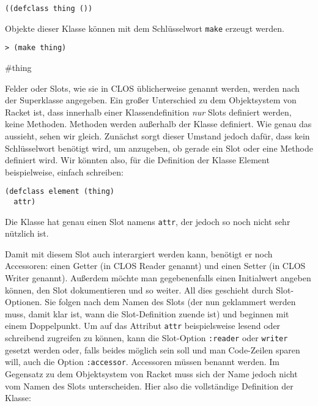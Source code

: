 \begin{lstlisting}
((defclass thing ())
\end{lstlisting}


Objekte dieser Klasse können mit dem Schlüsselwort \texttt{make} erzeugt werden.

\begin{lstlisting}
> (make thing)
\end{lstlisting}
{\routput \#thing}

Felder oder Slots, wie sie in CLOS üblicherweise genannt werden, werden nach der Superklasse angegeben. Ein großer Unterschied zu dem Objektsystem von Racket ist, dass innerhalb einer Klassendefinition \textit{nur} Slots definiert werden, keine Methoden. Methoden werden außerhalb der Klasse definiert. Wie genau das aussieht, sehen wir gleich. Zunächst sorgt dieser Umstand jedoch dafür, dass kein Schlüsselwort benötigt wird, um anzugeben, ob gerade ein Slot oder eine Methode definiert wird. Wir könnten also, für die Definition der Klasse Element beispielweise, einfach schreiben:

\begin{lstlisting}
(defclass element (thing)
  attr)
\end{lstlisting}

Die Klasse hat genau einen Slot namens \texttt{attr}, der jedoch so noch nicht sehr nützlich ist.

Damit mit diesem Slot auch interargiert werden kann, benötigt er noch Accessoren: einen Getter (in CLOS Reader genannt) und einen Setter (in CLOS Writer genannt). Außerdem möchte man gegebenenfalls einen Initialwert angeben können, den Slot dokumentieren und so weiter. All dies geschieht durch Slot-Optionen. Sie folgen nach dem Namen des Slots (der nun geklammert werden muss, damit klar ist, wann die Slot-Definition zuende ist) und beginnen mit einem Doppelpunkt. Um auf das Attribut \texttt{attr} beispielsweise lesend oder schreibend zugreifen zu können, kann die Slot-Option \texttt{:reader} oder \texttt{writer} gesetzt werden oder, falls beides möglich sein soll und man Code-Zeilen sparen will, auch die Option \texttt{:accessor}. Accessoren müssen benannt werden. Im Gegensatz zu dem Objektsystem von Racket muss sich der Name jedoch nicht vom Namen des Slots unterscheiden. Hier also die vollständige Definition der Klasse:

